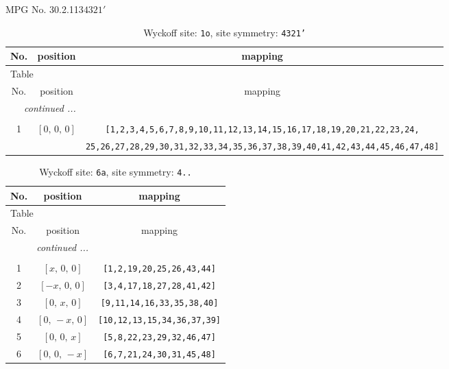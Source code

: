\documentclass[fleqn,8pt]{jsarticle}
\begin{document}
\setcounter{MaxMatrixCols}{32}

\renewcommand{\tablename}{Table~}
\renewcommand{\figurename}{Figure~}
\begin{center}
\LARGE
MPG No. 30.2.113\quad$4321'$
\end{center}
\renewcommand{\arraystretch}{1.2}
\begin{longtable}{ccc}
\caption{Wyckoff site: {\tt 1o}, site symmetry: {\tt 4321'}}
 \\
 \hline \hline
No. & position & mapping \\ \hline \endfirsthead

\multicolumn{2}{l}{\tablename\ \thetable{}} \\
 \hline \hline
No. & position & mapping \\ \hline \endhead

 \hline \hline
\multicolumn{2}{r}{\footnotesize\it continued ...} \\ \endfoot

 \hline \hline
\multicolumn{2}{r}{} \\ \endlastfoot

1 & $\left[ 0,\, 0,\, 0 \right]$ & {\tt [1,2,3,4,5,6,7,8,9,10,11,12,13,14,15,16,17,18,19,20,21,22,23,24,} \\ \hline
 &  & {\tt 25,26,27,28,29,30,31,32,33,34,35,36,37,38,39,40,41,42,43,44,45,46,47,48]} \\
\end{longtable}
\renewcommand{\arraystretch}{1.2}
\begin{longtable}{ccc}
\caption{Wyckoff site: {\tt 6a}, site symmetry: {\tt 4..}}
 \\
 \hline \hline
No. & position & mapping \\ \hline \endfirsthead

\multicolumn{2}{l}{\tablename\ \thetable{}} \\
 \hline \hline
No. & position & mapping \\ \hline \endhead

 \hline \hline
\multicolumn{2}{r}{\footnotesize\it continued ...} \\ \endfoot

 \hline \hline
\multicolumn{2}{r}{} \\ \endlastfoot

1 & $\left[ x,\, 0,\, 0 \right]$ & {\tt [1,2,19,20,25,26,43,44]} \\ \hline
2 & $\left[ - x,\, 0,\, 0 \right]$ & {\tt [3,4,17,18,27,28,41,42]} \\ \hline
3 & $\left[ 0,\, x,\, 0 \right]$ & {\tt [9,11,14,16,33,35,38,40]} \\ \hline
4 & $\left[ 0,\, - x,\, 0 \right]$ & {\tt [10,12,13,15,34,36,37,39]} \\ \hline
5 & $\left[ 0,\, 0,\, x \right]$ & {\tt [5,8,22,23,29,32,46,47]} \\ \hline
6 & $\left[ 0,\, 0,\, - x \right]$ & {\tt [6,7,21,24,30,31,45,48]} \\
\end{longtable}
\end{document}
